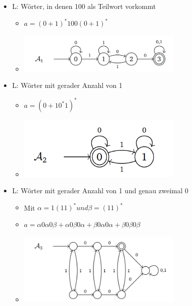 \documentclass[11pt,a4paper]{article}
\begin{document}
\begin{itemize}

\item L: Wörter, in denen 100 als Teilwort vorkommt
	\begin{itemize}
	\item $a = (0+1)^*100(0+1)^*$
	\item[]
		\begin{center}
		\includegraphics[width=8cm]{Bilder/auto1}
		\end{center}	
	\end{itemize}

\item L: Wörter mit gerader Anzahl von 1
	\begin{itemize}
	\item $a=(0+10^*1)^*$
	\item[]
		\begin{center}
		\includegraphics[width=8cm]{Bilder/auto2}
		\end{center}	
	\end{itemize}
	
\item L: Wörter mit gerader Anzahl von 1 und genau zweimal 0
	\begin{itemize}
	\item Mit $\alpha = 1(11)^* und \beta=(11)^*$
	\item $a = \alpha0\alpha0\beta + \alpha0\beta0\alpha + \beta0\alpha0\alpha + \beta0\beta0\beta$
	\item[]
		\begin{center}
		\includegraphics[width=8cm]{Bilder/auto3}
		\end{center}	
	\end{itemize}
	

\end{itemize}
\end{document}
